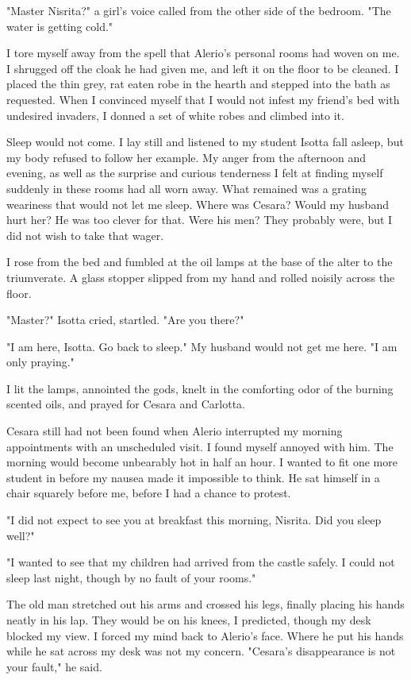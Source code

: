 \documentclass{article}
\begin{document}
"Master Nisrita?" a girl's voice called from the other side of the bedroom. "The water is getting cold."

I tore myself away from the spell that Alerio's personal rooms had woven on me. I shrugged off the cloak he had given me, and left it on the floor to be cleaned. I placed the thin grey, rat eaten robe in the hearth and stepped into the bath as requested. When I convinced myself that I would not infest my friend's bed with undesired invaders, I donned a set of white robes and climbed into it. 

Sleep would not come. I lay still and listened to my student Isotta fall asleep, but my body refused to follow her example. My anger from the afternoon and evening, as well as the surprise and curious tenderness I felt at finding myself suddenly in these rooms had all worn away. What remained was a grating weariness that would not let me sleep. Where was Cesara? Would my husband hurt her? He was too clever for that. Were his men? They probably were, but I did not wish to take that wager.

I rose from the bed and fumbled at the oil lamps at the base of the alter to the triumverate. A glass stopper slipped from my hand and rolled noisily across the floor.

"Master?" Isotta cried, startled. "Are you there?"

"I am here, Isotta. Go back to sleep." My husband would not get me here. "I am only praying."

I lit the lamps, annointed the gods, knelt in the comforting odor of the burning scented oils, and prayed for Cesara and Carlotta.

\vspace{.5cm}

Cesara still had not been found when Alerio interrupted my morning appointments with an unscheduled visit. I found myself annoyed with him. The morning would become unbearably hot in half an hour. I wanted to fit one more student in before my nausea made it impossible to think. He sat himself in a chair squarely before me, before I had a chance to protest.

"I did not expect to see you at breakfast this morning, Nisrita. Did you sleep well?"

"I wanted to see that my children had arrived from the castle safely. I could not sleep last night, though by no fault of your rooms."

The old man stretched out his arms and crossed his legs, finally placing his hands neatly in his lap. They would be on his knees, I predicted, though my desk blocked my view. I forced my mind back to Alerio's face. Where he put his hands while he sat across my desk was not my concern. "Cesara's disappearance is not your fault," he said.
\end{document}
